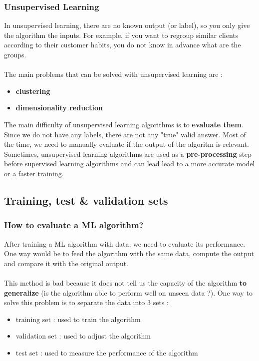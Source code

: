 \documentclass{beamer}
\begin{document}
\begin{frame}
  \frametitle{Unsupervised Learning}
  In unsupervised  learning, there are no known output (or label), so you only give the algorithm
  the inputs. For example, if you want to regroup similar clients according to
  their customer habits, you do not know in advance what are the groups.\\~\\

  The main problems that can be solved with unsupervised learning are :
  \begin{itemize}
    \item \textbf{clustering}
    \item \textbf{dimensionality reduction}
  \end{itemize}

  The main difficulty of unsupervised learning algorithms is to \textbf{evaluate
  them}. Since we do not have any labels, there are not any "true" valid answer.
  Most of the time, we need to manually evaluate if the output of the algoritm
  is relevant. Sometimes, unsupervised learning algorithms are used as a
  \textbf{pre-processing} step before supervised learning algorithms and can
  lead lead to a more accurate model or a faster training.
\end{frame}

\subsection{Training, test \& validation sets}
\begin{frame}
  \frametitle{How to evaluate a ML algorithm?}
  After training a ML algorithm with data, we need to evaluate its performance.
  One way would be to feed the algorithm with the same data, compute the output
  and compare it with the original output.\\~\\

  This method is bad because it does not tell us the capacity of the algorithm
  \textbf{to generalize} (is the algorithm able to perform well on unseen data
  ?). One way to solve this problem is to separate the data into 3 sets :
  \begin{itemize}
    \item training set : used to train the algorithm
    \item validation set : used to adjust the algorithm
    \item test set : used to measure the performance of the algorithm
  \end{itemize}
\end{frame}
\end{document}
